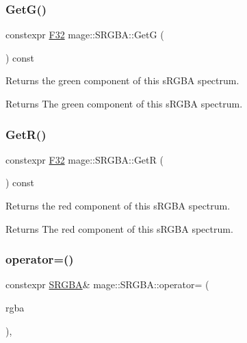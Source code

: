 \subsubsection{\texorpdfstring{Get\+G()}{GetG()}}
{\footnotesize\ttfamily constexpr \mbox{\hyperlink{namespacemage_aa97e833b45f06d60a0a9c4fc22ae02c0}{F32}} mage\+::\+S\+R\+G\+B\+A\+::\+GetG (\begin{DoxyParamCaption}{ }\end{DoxyParamCaption}) const\hspace{0.3cm}{\ttfamily [noexcept]}}

Returns the green component of this s\+R\+G\+BA spectrum.

\begin{DoxyReturn}{Returns}
The green component of this s\+R\+G\+BA spectrum. 
\end{DoxyReturn}
\mbox{\label{structmage_1_1_s_r_g_b_a_a7f88a4619ba00d7a8d8b33e5f07b3b81}} 
\subsubsection{\texorpdfstring{Get\+R()}{GetR()}}
{\footnotesize\ttfamily constexpr \mbox{\hyperlink{namespacemage_aa97e833b45f06d60a0a9c4fc22ae02c0}{F32}} mage\+::\+S\+R\+G\+B\+A\+::\+GetR (\begin{DoxyParamCaption}{ }\end{DoxyParamCaption}) const\hspace{0.3cm}{\ttfamily [noexcept]}}

Returns the red component of this s\+R\+G\+BA spectrum.

\begin{DoxyReturn}{Returns}
The red component of this s\+R\+G\+BA spectrum. 
\end{DoxyReturn}
\mbox{\label{structmage_1_1_s_r_g_b_a_affa097b1744a66624f40102870909ea9}} 
\subsubsection{\texorpdfstring{operator=()}{operator=()}\hspace{0.1cm}{\footnotesize\ttfamily [1/2]}}
{\footnotesize\ttfamily constexpr \mbox{\hyperlink{structmage_1_1_s_r_g_b_a}{S\+R\+G\+BA}}\& mage\+::\+S\+R\+G\+B\+A\+::operator= (\begin{DoxyParamCaption}\item[{const \mbox{\hyperlink{structmage_1_1_s_r_g_b_a}{S\+R\+G\+BA}} \&}]{rgba }\end{DoxyParamCaption})\hspace{0.3cm}{\ttfamily [default]}, {\ttfamily [noexcept]}}

